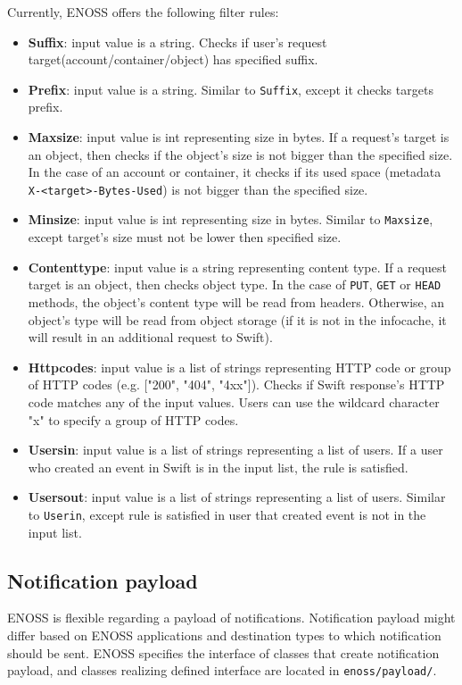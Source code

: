     Currently, ENOSS offers the following filter rules:
    \begin{itemize}
        \item \textbf{Suffix}: input value is a string. Checks if user's request target(account/container/object) has specified suffix.
        \item \textbf{Prefix}: input value is a string. Similar to \texttt{Suffix}, except it checks targets prefix.
        \item \textbf{Maxsize}: input value is int representing size in bytes. If a request's target is an object, then checks if the object's size is not bigger than the specified size. In the case of an account or container, it checks if its used space (metadata \texttt{X-<target>-Bytes-Used}) is not bigger than the specified size.
        \item \textbf{Minsize}: input value is int representing size in bytes. Similar to \texttt{Maxsize}, except target's size must not be lower then specified size.
        \item \textbf{Contenttype}: input value is a string representing content type. If a request target is an object, then checks object type. In the case of \texttt{PUT}, \texttt{GET} or \texttt{HEAD} methods, the object's content type will be read from headers. Otherwise, an object's type will be read from object storage (if it is not in the infocache, it will result in an additional request to Swift).
        \item \textbf{Httpcodes}: input value is a list of strings representing HTTP code or group of HTTP codes (e.g. ["200", "404", "4xx"]). Checks if Swift response's HTTP code matches any of the input values. Users can use the wildcard character "x" to specify a group of HTTP codes.
        \item \textbf{Usersin}: input value is a list of strings representing a list of users. If a user who created an event in Swift is in the input list, the rule is satisfied.
        \item \textbf{Usersout}: input value is a list of strings representing a list of users. Similar to \texttt{Userin}, except rule is satisfied in user that created event is not in the input list.
    \end{itemize}

    \subsection{Notification payload}
    ENOSS is flexible regarding a payload of notifications. Notification payload might differ based on ENOSS applications and destination types to which notification should be sent. ENOSS specifies the interface of classes that create notification payload, and classes realizing defined interface are located in \texttt{enoss/payload/}.

